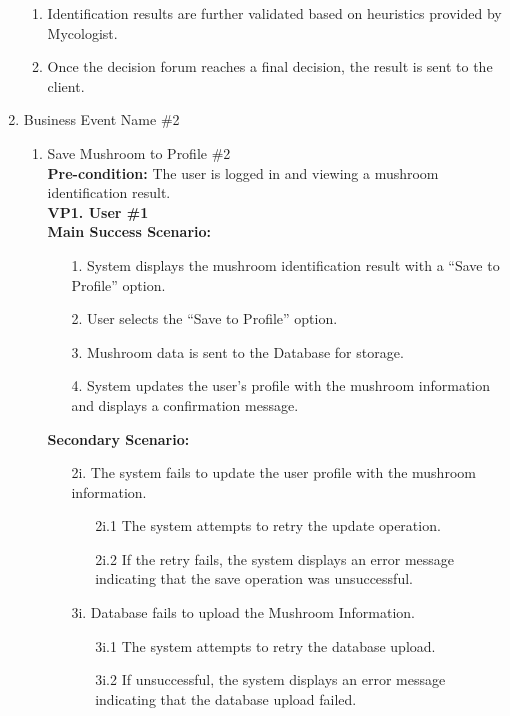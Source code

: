 \documentclass[]{article}
\begin{document}
\begin{enumerate}[{\bf BE1.}]
\begin{enumerate}[1.]
			\item Identification results are further validated based on heuristics provided by Mycologist.
			\item Once the decision forum reaches a final decision, the result is sent to the client.
		\end{enumerate}
	\item Business Event Name \#2
	\begin{enumerate}[{\bf BE2.}]
	    \item Save Mushroom to Profile \#2\\
	    \textbf{Pre-condition:} The user is logged in and viewing a mushroom identification result.\\[1mm]
	    
	    \textbf{VP1. User \#1}\\
	    \textbf{Main Success Scenario:}
	    \begin{enumerate}
	        \item[1.] System displays the mushroom identification result with a ``Save to Profile'' option.
	        \item[2.] User selects the ``Save to Profile'' option.
	        \item[3.] Mushroom data is sent to the Database for storage.
	        \item[4.] System updates the user's profile with the mushroom information and displays a confirmation message.
	    \end{enumerate}
	    \textbf{Secondary Scenario:}
	    {\color{red}
	    \begin{enumerate}
	        \item[2i.] The system fails to update the user profile with the mushroom information.
	        \begin{enumerate}
	            \item[2i.1] The system attempts to retry the update operation.
	            \item[2i.2] If the retry fails, the system displays an error message indicating that the save operation was unsuccessful. 
	        \end{enumerate}
	        \item[3i.] Database fails to upload the Mushroom Information.
	        \begin{enumerate}
	            \item[3i.1] The system attempts to retry the database upload.
	            \item[3i.2] If unsuccessful, the system displays an error message indicating that the database upload failed.

\end{enumerate}
\end{enumerate}}
\end{enumerate}
\end{enumerate}
\end{document}

